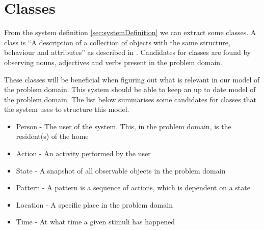 \section{Classes}\label{sec:classes}
From the system definition \cref{sec:systemDefinition} we can extract some classes. A class is \enquote{A description of a collection of objects with the same structure, behaviour and attributes} as described in \cite{OOAD}. Candidates for classes are found by observing nouns, adjectives and verbs present in the problem domain.

These classes will be beneficial when figuring out what is relevant in our model of the problem domain. This system should be able to keep an up to date model of the problem domain. The list below summarises some candidates for classes that the system uses to structure this model.

\begin{itemize}
\item Person - The user of the system. This, in the problem domain, is the resident(s) of the home
\item Action - An activity performed by the user
\item State - A snapshot of all observable objects in the problem domain
\item Pattern - A pattern is a sequence of actions, which is dependent on a state
\item Location - A specific place in the problem domain
\item Time - At what time a given stimuli has happened
\end{itemize}
